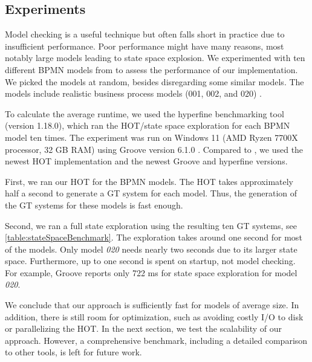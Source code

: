 \documentclass{lmcs} %
\begin{document}
\subsection{Experiments}

Model checking is a useful technique but often falls short in practice due to insufficient performance.
Poor performance might have many reasons, most notably large models leading to state space explosion.
We experimented with ten different BPMN models from \cite{houhouFirstOrderLogicVerification2022} to assess the performance of our implementation.
We picked the models at random, besides disregarding some similar models.
The models include realistic business process models (001, 002, and 020) \cite{houhouFirstOrderLogicVerification2022}.

To calculate the average runtime, we used the hyperfine benchmarking tool \cite{peterHyperfine2023} (version 1.18.0), which ran the HOT/state space exploration for each BPMN model ten times.
The experiment was run on Windows 11 (AMD Ryzen 7700X processor, 32 GB RAM) using Groove version 6.1.0 \cite{timkrauterLMCS2024Artifacts2023}.
Compared to \cite{krauterFormalizationAnalysisBPMN2023}, we used the newest HOT implementation and the newest Groove and hyperfine versions.

First, we ran our HOT for the BPMN models.
The HOT takes approximately half a second to generate a GT system for each model.
Thus, the generation of the GT systems for these models is fast enough.

Second, we ran a full state exploration using the resulting ten GT systems, see \autoref{table:stateSpaceBenchmark}.
The exploration takes around one second for most of the models.
Only model \textit{020} needs nearly two seconds due to its larger state space.
Furthermore, up to one second is spent on startup, not model checking.
For example, Groove reports only 722 ms for state space exploration for model \textit{020}.

We conclude that our approach is sufficiently fast for models of average size.
In addition, there is still room for optimization, such as avoiding costly I/O to disk or parallelizing the HOT.
In the next section, we test the scalability of our approach.
However, a comprehensive benchmark, including a detailed comparison to other tools, is left for future work.
\end{document}
